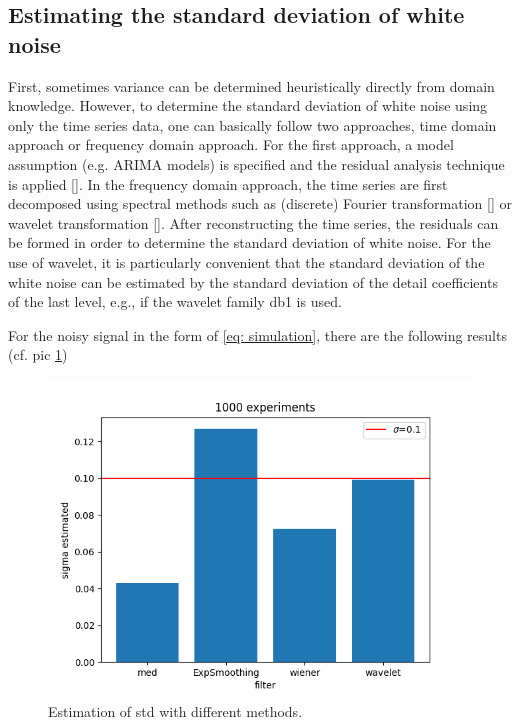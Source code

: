 \documentclass[oneside]{article}
\theoremstyle{plain}%
\theoremstyle{definition}
\begin{document}
\subsection{Estimating the standard deviation of white noise}

First, sometimes variance can be determined heuristically directly from domain knowledge. 
However, to determine the standard deviation of white noise using only the time series data, one can basically follow two approaches, time domain approach or frequency domain approach. For the first approach, a model assumption (e.g. ARIMA models) is specified and the residual analysis technique is applied [\cite{chitturi1974distribution}]. 
In the frequency domain approach, the time series are first decomposed using spectral methods such as (discrete) Fourier transformation [\cite{sauer1992noise}] or wavelet transformation [\cite{heil1989continuous,donoho1994ideal,jansen2012noise}]. After reconstructing the time series, the residuals can be formed in order to determine the standard deviation of white noise. For the use of wavelet, it is particularly convenient that the standard deviation of the white noise can be estimated by the standard deviation of the detail coefficients of the last level, e.g., if the wavelet family db1 is used.

For the noisy signal in the form of \ref{eq: simulation},  there are the following results (cf. pic \ref{fig:estimation std})

\begin{figure}
  \centering
\includegraphics[scale=0.5]{plots/std_estimate.png}
  \caption{Estimation of std with different methods.}
  \label{fig:estimation std}
\end{figure}
\end{document}
